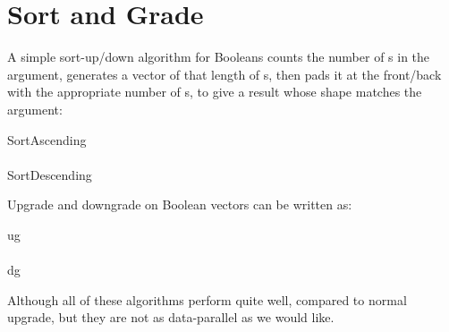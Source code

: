 \section{Sort and Grade}
\label{sortandgrade}

A simple sort-up/down algorithm for Booleans counts the number
of {}s in the argument, generates a vector of that
length of {}s, then pads it at the front/back with the appropriate
number of {}s, to give a result whose shape matches the argument:

\medskip
{\apl SortAscending\qlarrow\qlbrace\qlpar\qbar\qrho\qomega\qrpar\quarrow\qlpar\qplus\qslash\qomega\qrpar\qrho{}\qrbrace}\\
~\\
{\apl SortDescending\qlarrow\qlbrace\qlpar\qrho\qomega\qrpar\quarrow\qlpar\qplus\qslash\qomega\qrpar\qrho{}\qrbrace}\\
\medskip

\noindent Upgrade and downgrade on Boolean vectors can be written as:

\medskip
{\apl ug\qlarrow\qlbrace\qlpar\qlpar\qtilde\qomega\qrpar\qslash\qiota\qrho\qomega\qrpar\qcomma\qomega\qslash\qiota\qrho\qomega\qrbrace}\\
~\\
{\apl dg\qlarrow\qlbrace\qlpar\qlpar\qomega\qslash\qiota\qrho\qomega\qrpar\qcomma\qlpar\qtilde\qomega\qrpar\qslash\qiota\qrho\qomega\qrbrace}\\


Although all of these algorithms perform quite well, compared
to normal upgrade, but they are not as data-parallel as we would like.
